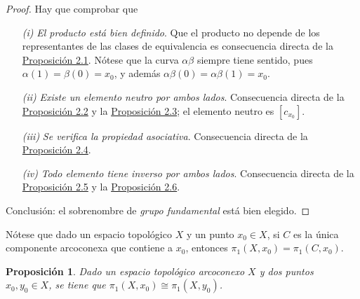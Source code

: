 \documentclass[11pt]{report}
\newtheorem{proposition}{Proposición}[chapter]
\theoremstyle{definition}
\theoremstyle{definition}
\theoremstyle{remark}
\begin{document}
\begin{proof}
Hay que comprobar que
\begin{itemize}
    \item[\textit{(i)}] \textit{El producto está bien definido}. Que el producto no depende de los representantes de las clases de equivalencia es consecuencia directa de la \hyperref[prop2.1.]{\color{blue}Proposición 2.1}. Nótese que la curva $\alpha\beta$ siempre tiene sentido, pues $\alpha(1)=\beta(0)=x_0$, y además $\alpha\beta(0)=\alpha\beta(1)=x_0$.
    \item[\textit{(ii)}] \textit{Existe un elemento neutro por ambos lados}. Consecuencia directa de la \hyperref[prop2.2.]{\color{blue}Proposición 2.2} y la \hyperref[prop2.3.]{\color{blue}Proposición 2.3}; el elemento neutro es $[c_{x_0}]$.
    \item[\textit{(iii)}] \textit{Se verifica la propiedad asociativa}. Consecuencia directa de la \hyperref[prop2.4.]{\color{blue}Proposición 2.4}.
    \item[\textit{(iv)}] \textit{Todo elemento tiene inverso por ambos lados}. Consecuencia directa de la \hyperref[prop2.5.]{\color{blue}Proposición 2.5} y la \hyperref[prop2.6.]{\color{blue}Proposición 2.6}.
\end{itemize}
Conclusión: el sobrenombre de \textit{grupo fundamental} está bien elegido.
\end{proof}

Nótese que dado un espacio topológico $X$ y un punto $x_0 \in X$, si $C$ es la única componente arcoconexa que contiene a $x_0$, entonces $\pi_1(X,x_0) = \pi_1(C,x_0)$.

\begin{proposition}
\label{prop2.7.}
    Dado un espacio topológico arcoconexo $X$ y dos puntos $x_0,y_0 \in X$, se tiene que $\pi_1(X,x_0) \cong \pi_1(X,y_0)$.
\end{proposition}
\end{document}
